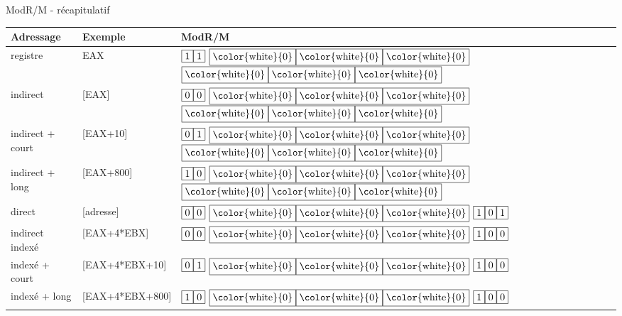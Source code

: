 \documentclass[14pt,xcolor,table]{beamer}
\begin{document}
\begin{frame}[fragile]{ModR/M - récapitulatif}

	\begin{small}
	\begin{tabular}{l|l|l}
		Adressage & Exemple & ModR/M \\\hline\hline
		registre & EAX & 
					$\fbox{1}\fbox{1}$
					$\fbox{\color{white}{0}}\fbox{\color{white}{0}}\fbox{\color{white}{0}}$
					$\fbox{\color{white}{0}}\fbox{\color{white}{0}}\fbox{\color{white}{0}}$
			 \\
		indirect & [EAX] &
					$\fbox{0}\fbox{0}$
					$\fbox{\color{white}{0}}\fbox{\color{white}{0}}\fbox{\color{white}{0}}$
					$\fbox{\color{white}{0}}\fbox{\color{white}{0}}\fbox{\color{white}{0}}$
			 \\
		indirect + court & [EAX+10] &
					$\fbox{0}\fbox{1}$
					$\fbox{\color{white}{0}}\fbox{\color{white}{0}}\fbox{\color{white}{0}}$
					$\fbox{\color{white}{0}}\fbox{\color{white}{0}}\fbox{\color{white}{0}}$
			\\
		indirect + long & [EAX+800] &
					$\fbox{1}\fbox{0}$
					$\fbox{\color{white}{0}}\fbox{\color{white}{0}}\fbox{\color{white}{0}}$
					$\fbox{\color{white}{0}}\fbox{\color{white}{0}}\fbox{\color{white}{0}}$
			\\
		direct & [adresse] &
					$\fbox{0}\fbox{0}$
					$\fbox{\color{white}{0}}\fbox{\color{white}{0}}\fbox{\color{white}{0}}$
					$\fbox{1}\fbox{0}\fbox{1}$
			\\
		indirect indexé & [EAX+4*EBX] &
					$\fbox{0}\fbox{0}$
					$\fbox{\color{white}{0}}\fbox{\color{white}{0}}\fbox{\color{white}{0}}$
					$\fbox{1}\fbox{0}\fbox{0}$
			\\
		indexé + court & [EAX+4*EBX+10] &
					$\fbox{0}\fbox{1}$
					$\fbox{\color{white}{0}}\fbox{\color{white}{0}}\fbox{\color{white}{0}}$
					$\fbox{1}\fbox{0}\fbox{0}$
			\\
		indexé + long & [EAX+4*EBX+800] &
					$\fbox{1}\fbox{0}$
					$\fbox{\color{white}{0}}\fbox{\color{white}{0}}\fbox{\color{white}{0}}$
					$\fbox{1}\fbox{0}\fbox{0}$
			\\
	\end{tabular}
	\end{small}
	
\end{frame}
\end{document}
